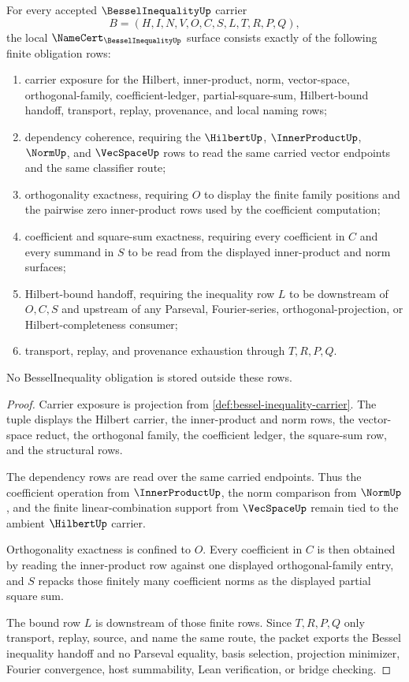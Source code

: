 \begin{theorem}
\label{thm:bessel-inequality-namecert-obligations}
For every accepted $\BesselInequalityUp$ carrier
$$
B=(H,I,N,V,O,C,S,L,T,R,P,Q),
$$
the local $\NameCert_{\BesselInequalityUp}$ surface consists exactly of the following finite obligation rows:
\begin{enumerate}
\item carrier exposure for the Hilbert, inner-product, norm, vector-space, orthogonal-family, coefficient-ledger, partial-square-sum, Hilbert-bound handoff, transport, replay, provenance, and local naming rows;
\item dependency coherence, requiring the $\HilbertUp$, $\InnerProductUp$, $\NormUp$, and $\VecSpaceUp$ rows to read the same carried vector endpoints and the same classifier route;
\item orthogonality exactness, requiring $O$ to display the finite family positions and the pairwise zero inner-product rows used by the coefficient computation;
\item coefficient and square-sum exactness, requiring every coefficient in $C$ and every summand in $S$ to be read from the displayed inner-product and norm surfaces;
\item Hilbert-bound handoff, requiring the inequality row $L$ to be downstream of $O,C,S$ and upstream of any Parseval, Fourier-series, orthogonal-projection, or Hilbert-completeness consumer;
\item transport, replay, and provenance exhaustion through $T,R,P,Q$.
\end{enumerate}
No BesselInequality obligation is stored outside these rows.
\end{theorem}
\begin{proof}
Carrier exposure is projection from \autoref{def:bessel-inequality-carrier}. The tuple displays the Hilbert carrier, the inner-product and norm rows, the vector-space reduct, the orthogonal family, the coefficient ledger, the square-sum row, and the structural rows.

The dependency rows are read over the same carried endpoints. Thus the coefficient operation from $\InnerProductUp$, the norm comparison from $\NormUp$, and the finite linear-combination support from $\VecSpaceUp$ remain tied to the ambient $\HilbertUp$ carrier.

Orthogonality exactness is confined to $O$. Every coefficient in $C$ is then obtained by reading the inner-product row against one displayed orthogonal-family entry, and $S$ repacks those finitely many coefficient norms as the displayed partial square sum.

The bound row $L$ is downstream of those finite rows. Since $T,R,P,Q$ only transport, replay, source, and name the same route, the packet exports the Bessel inequality handoff and no Parseval equality, basis selection, projection minimizer, Fourier convergence, host summability, Lean verification, or bridge checking.
\end{proof}

